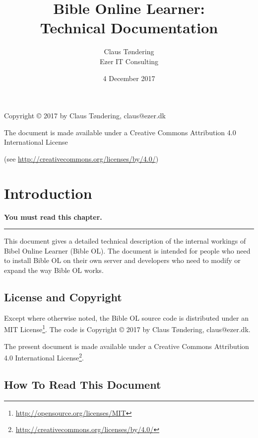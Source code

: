 \documentclass[11pt,oneside,a4paper]{memoir}
\title{Bible Online Learner:\\Technical Documentation}
\author{Claus Tøndering\\Ezer IT Consulting}
\date{4 December 2017}
\begin{document}
\begin{titlingpage*}
\maketitle

\begin{center}
Copyright © 2017 by Claus Tøndering, claus@ezer.dk

\vspace{5mm}

The document is made available under a Creative Commons Attribution 4.0 International License

(see \url{http://creativecommons.org/licenses/by/4.0/})
\end{center}
\end{titlingpage*}


\clearpage
\tableofcontents
{} %

\chapter{Introduction}

\textbf{You must read this chapter.}
\plainbreak{3}

This document gives a detailed technical description of the internal workings of Bibel Online
Learner (Bible OL). The document is intended for people who need to install Bible OL on their own
server and developers who need to modify or expand the way Bible OL works.

\section{License and Copyright}

Except where otherwise noted, the Bible OL source code is distributed under an MIT
License\footnote{\url{http://opensource.org/licenses/MIT}}. The code is Copyright © 2017 by Claus
Tøndering, claus@ezer.dk.

The present document is made available under a Creative Commons Attribution 4.0 International
License\footnote{\url{http://creativecommons.org/licenses/by/4.0/}}.


\section{How To Read This Document}
\end{document}
